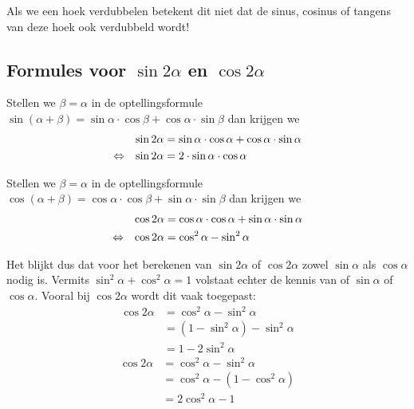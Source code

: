 \documentclass[a4paper,12pt]{article}
\begin{document}
Als we een hoek verdubbelen betekent dit niet dat de sinus, cosinus of tangens van deze hoek ook verdubbeld wordt!

\subsection{Formules voor $\sin 2\alpha$ en $\cos 2\alpha$}


Stellen we $\beta=\alpha$ in de optellingsformule $\sin(\alpha+\beta)=\sin\alpha\cdot\cos\beta + \cos\alpha\cdot\sin\beta$ dan krijgen we
\begin{align*}
       && \sin 2\alpha &= \sin\alpha\cdot\cos\alpha+\cos\alpha\cdot\sin\alpha\\
  \Leftrightarrow && \sin 2\alpha &= 2\cdot\sin\alpha\cdot\cos\alpha
\end{align*}

Stellen we $\beta=\alpha$ in de optellingsformule $\cos(\alpha+\beta)=\cos\alpha\cdot\cos\beta + \sin\alpha\cdot\sin\beta$ dan krijgen we
\begin{align*}
       && \cos 2\alpha &= \cos\alpha\cdot\cos\alpha+\sin\alpha\cdot\sin\alpha\\
  \Leftrightarrow && \cos 2\alpha &= \cos^2\alpha -\sin^2\alpha
\end{align*}

Het blijkt dus dat voor het berekenen van $\sin 2\alpha$ of $\cos 2\alpha$ zowel $\sin\alpha$ als $\cos\alpha$
nodig is. Vermits $\sin^2\alpha + \cos^2\alpha = 1$ volstaat echter de kennis van of $\sin\alpha$ of
$\cos\alpha$. Vooral bij $\cos 2\alpha$ wordt dit vaak toegepast:
\begin{align*}
       \cos 2\alpha &= \cos^2\alpha - \sin^2\alpha\\
                    &= (1 - \sin^2\alpha) - \sin^2\alpha\\
                    &= 1 - 2\sin^2\alpha
\end{align*}
\begin{align*}
       \cos 2\alpha &= \cos^2\alpha - \sin^2\alpha\\
                    &= \cos^2\alpha - (1 - \cos^2\alpha)\\
                    &= 2\cos^2\alpha - 1
\end{align*}
\end{document}

